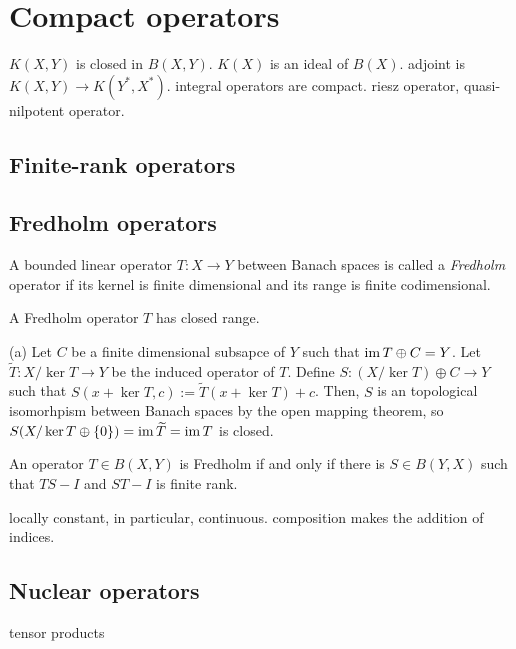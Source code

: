 \documentclass{../../large}
\begin{document}
\chapter{Compact operators}

$K(X,Y)$ is closed in $B(X,Y)$.
$K(X)$ is an ideal of $B(X)$.
adjoint is $K(X,Y)\to K(Y^*,X^*)$.
integral operators are compact.
riesz operator, quasi-nilpotent operator.

\section{Finite-rank operators}
\section{Fredholm operators}

\begin{prb}
A bounded linear operator $T:X\to Y$ between Banach spaces is called a \emph{Fredholm} operator if its kernel is finite dimensional and its range is finite codimensional.
\begin{parts}
\item A Fredholm operator $T$ has closed range.
\end{parts}
\end{prb}
\begin{pf}
(a)
Let $C$ be a finite dimensional subsapce of $Y$ such that $\operatorname{im} T\oplus C=Y$.
Let $\tilde T:X/\ker T\to Y$ be the induced operator of $T$.
Define $S:(X/\ker T)\oplus C\to Y$ such that $S(x+\ker T,c):=\tilde T(x+\ker T)+c$.
Then, $S$ is an topological isomorhpism between Banach spaces by the open mapping theorem, so $S(X/\ker T\oplus\{0\})=\operatorname{im}\widetilde T=\operatorname{im} T$ is closed.
\end{pf}

\begin{prb}
An operator $T\in B(X,Y)$ is Fredholm if and only if there is $S\in B(Y,X)$ such that $TS-I$ and $ST-I$ is finite rank.
\end{prb}

\begin{prb}
locally constant, in particular, continuous.
composition makes the addition of indices.
\end{prb}

\section{Nuclear operators}
tensor products
\end{document}
